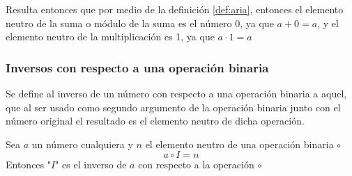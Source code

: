 \documentclass[11pt,letterpaper]{article}
\begin{document}
	Resulta entonces que por medio de la definición \ref{def:aria}, entonces el elemento neutro de la suma o módulo de la suma es el número 0, ya que $a+0=a$, y el elemento neutro de la multiplicación es 1, ya que $a \cdot 1 = a$
	
	\subsubsection{Inversos con respecto a una operación binaria}
	
	Se define al inverso de un número con respecto a una operación binaria a aquel, que al ser usado como segundo argumento de la operación binaria junto con el número original el resultado es el elemento neutro de dicha operación.
	
	\begin{definición}
		Sea $a$ un número cualquiera y $n$ el elemento neutro de una operación binaria $\circ$
		\begin{equation}
			a \circ I = n \label{ec:inv}
		\end{equation}
		Entonces "$I$" es el inverso de $a$ con respecto a la operación $\circ$
	\end{definición}
	
	
	
	\printbibliography[title={Referencias}]
	
\end{document}
